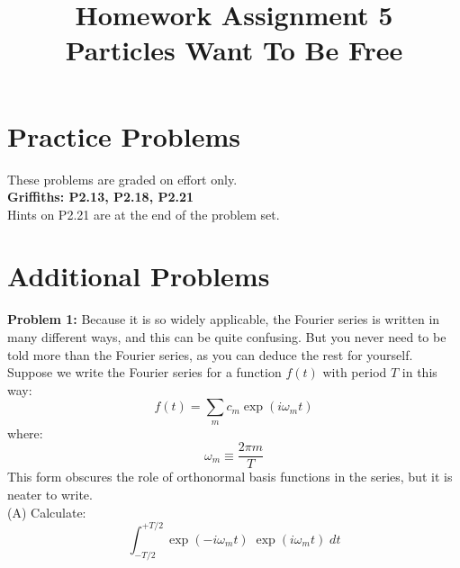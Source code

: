 \documentclass[12pt]{article}
\begin{document}
\newcommand{\ihbar}{\ensuremath{i \hbar}}
\newcommand{\dPsidt}{\ensuremath{ \frac{\partial \Psi}{\partial t} }}
\newcommand{\dPsidx}{\ensuremath{ \frac{\partial \Psi}{\partial x} }}
\newcommand{\ddPsidx}{\ensuremath{ \frac{\partial^2 \Psi}{\partial x^2} }}
\newcommand{\dPssdt}{\ensuremath{ \frac{\partial \Psi^*}{\partial t} }}
\newcommand{\dPssdx}{\ensuremath{ \frac{\partial \Psi^*}{\partial x} }}
\newcommand{\ddPssdx}{\ensuremath{ \frac{\partial^2 \Psi^*}{\partial x^2} }}

\newcommand{\dphidt}{\ensuremath{ \frac{d \phi}{dt} }}
\newcommand{\dpsidx}{\ensuremath{ \frac{d \psi}{dx} }}
\newcommand{\ddpsidx}{\ensuremath{ \frac{d^2 \psi}{dx^2} }}


\date{\vspace{-5ex}}

\title{Homework Assignment 5 \\ Particles Want To Be Free}

\maketitle

\section*{Practice Problems}

These problems are graded on effort only.\\

\noindent
{\bf Griffiths: P2.13, P2.18, P2.21} \\
Hints on P2.21 are at the end of the problem set.

\section*{Additional Problems}

\noindent
{\bf Problem 1:} Because it is so widely applicable, the Fourier series is written in many different ways, and this can be quite confusing.  But you never need to be told more than the Fourier series, as you can deduce the rest for yourself.  Suppose we write the Fourier series for a function $f(t)$ with period $T$ in this way:
$$f(t) = \sum_m c_m \exp(i \omega_m t)$$
where:
$$\omega_m \equiv \frac{2 \pi m}{T}$$
This form obscures the role of orthonormal basis functions in the series, but it is neater to write.\\

\noindent
(A) Calculate:
$$ \int_{-T/2}^{+T/2} \exp(-i \omega_m t) \; \exp(i \omega_m t)  \; dt $$
\end{document}
